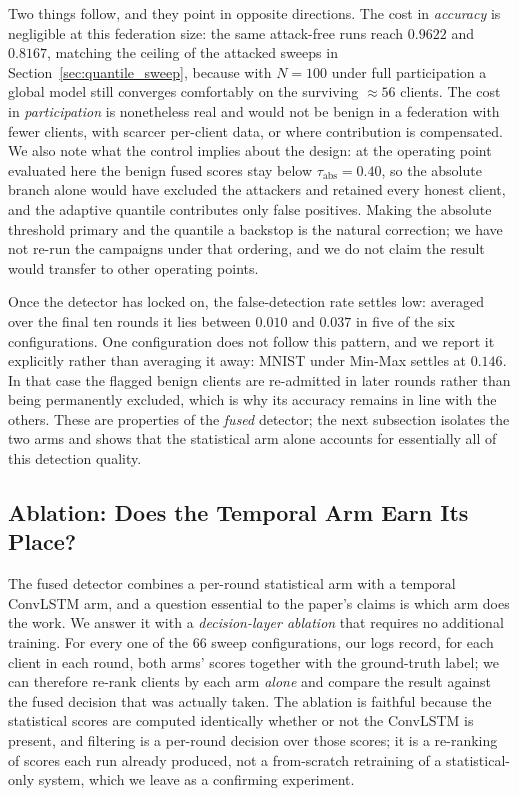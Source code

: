 \documentclass[journal]{IEEEtran}
\begin{document}
Two things follow, and they point in opposite directions. The cost in \emph{accuracy} is negligible at this federation size: the same attack-free runs reach $0.9622$ and $0.8167$, matching the ceiling of the attacked sweeps in Section~\ref{sec:quantile_sweep}, because with $N = 100$ under full participation a global model still converges comfortably on the surviving $\approx56$ clients. The cost in \emph{participation} is nonetheless real and would not be benign in a federation with fewer clients, with scarcer per-client data, or where contribution is compensated. We also note what the control implies about the design: at the operating point evaluated here the benign fused scores stay below $\tau_{\mathrm{abs}} = 0.40$, so the absolute branch alone would have excluded the attackers and retained every honest client, and the adaptive quantile contributes only false positives. Making the absolute threshold primary and the quantile a backstop is the natural correction; we have not re-run the campaigns under that ordering, and we do not claim the result would transfer to other operating points.

Once the detector has locked on, the false-detection rate settles low: averaged over the final ten rounds it lies between $0.010$ and $0.037$ in five of the six configurations. One configuration does not follow this pattern, and we report it explicitly rather than averaging it away: MNIST under Min-Max settles at $0.146$. In that case the flagged benign clients are re-admitted in later rounds rather than being permanently excluded, which is why its accuracy remains in line with the others. These are properties of the \emph{fused} detector; the next subsection isolates the two arms and shows that the statistical arm alone accounts for essentially all of this detection quality.

\subsection{Ablation: Does the Temporal Arm Earn Its Place?}
\label{sec:ablation}

The fused detector combines a per-round statistical arm with a temporal ConvLSTM arm, and a question essential to the paper's claims is which arm does the work. We answer it with a \emph{decision-layer ablation} that requires no additional training. For every one of the $66$ sweep configurations, our logs record, for each client in each round, both arms' scores together with the ground-truth label; we can therefore re-rank clients by each arm \emph{alone} and compare the result against the fused decision that was actually taken. The ablation is faithful because the statistical scores are computed identically whether or not the ConvLSTM is present, and filtering is a per-round decision over those scores; it is a re-ranking of scores each run already produced, not a from-scratch retraining of a statistical-only system, which we leave as a confirming experiment.
\end{document}

